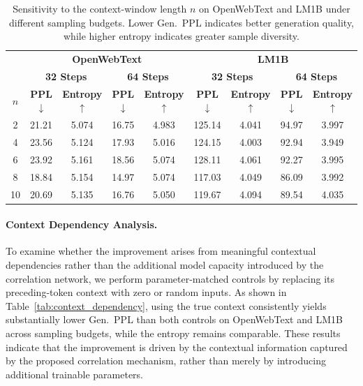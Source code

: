\documentclass{article} %
\begin{document}
\begin{table}[t]
    \centering
    \small
    \begin{tabular}{c|cc|cc|cc|cc}
        \toprule
        & \multicolumn{4}{c|}{\textbf{OpenWebText}}
        & \multicolumn{4}{c}{\textbf{LM1B}} \\
        \cmidrule(lr){2-5}
        \cmidrule(lr){6-9}
        & \multicolumn{2}{c|}{\textbf{32 Steps}}
        & \multicolumn{2}{c|}{\textbf{64 Steps}}
        & \multicolumn{2}{c|}{\textbf{32 Steps}}
        & \multicolumn{2}{c}{\textbf{64 Steps}} \\
        \textbf{$n$}
        & \textbf{PPL $\downarrow$}
        & \textbf{Entropy $\uparrow$}
        & \textbf{PPL $\downarrow$}
        & \textbf{Entropy $\uparrow$}
        & \textbf{PPL $\downarrow$}
        & \textbf{Entropy $\uparrow$}
        & \textbf{PPL $\downarrow$}
        & \textbf{Entropy $\uparrow$} \\
        \midrule

        2
        & 21.21 & 5.074
        & 16.75 & 4.983
        & 125.14 & 4.041
        & 94.97 & 3.997 \\

      
        4
        & 23.56 & 5.124
        & 17.93 & 5.016
        & 124.15 & 4.003
        & 92.94 & 3.949 \\

        6
        & 23.92 & 5.161
        & 18.56 & 5.074
        & 128.11 & 4.061
        & 92.27 & 3.995 \\

        8
        & 18.84 & 5.154
        & 14.97 & 5.074
        & 117.03 & 4.049
        & 86.09 & 3.992 \\

        10
        & 20.69 & 5.135
        & 16.76 & 5.050
        & 119.67 & 4.094
        & 89.54 & 4.035 \\

        \bottomrule
    \end{tabular}
    \caption{Sensitivity to the context-window length $n$ on OpenWebText
    and LM1B under different sampling budgets. Lower Gen.~PPL indicates
    better generation quality, while higher entropy indicates greater
    sample diversity.}
    \label{tab:context_sensitivity}
\end{table}


\paragraph{Context Dependency Analysis.}
To examine whether the improvement arises from meaningful contextual
dependencies rather than the additional model capacity introduced by the
correlation network, we perform parameter-matched controls by replacing
its preceding-token context with zero or random inputs.
As shown in Table~\ref{tab:context_dependency}, using the true context
consistently yields substantially lower Gen.~PPL than both controls on
OpenWebText and LM1B across sampling budgets, while the entropy remains
comparable. These results indicate that the improvement is driven by the
contextual information captured by the proposed correlation mechanism,
rather than merely by introducing additional trainable parameters.
\end{document}
